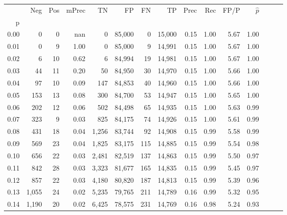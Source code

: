 \begin{tabular}{rrrrrrrrrrrrrrr}
\toprule
{} &    Neg &  Pos & mPrec &      TN &      FP &      FN &      TP &  Prec &   Rec &  FP/P & $\hat{p}$ \\
p    &        &      &       &         &         &         &         &       &       &       &           \\
\midrule
0.00 &      0 &    0 &   nan &       0 &  85,000 &       0 &  15,000 &  0.15 &  1.00 &  5.67 &      1.00 \\
0.01 &      0 &    9 &  1.00 &       0 &  85,000 &       9 &  14,991 &  0.15 &  1.00 &  5.67 &      1.00 \\
0.02 &      6 &   10 &  0.62 &       6 &  84,994 &      19 &  14,981 &  0.15 &  1.00 &  5.67 &      1.00 \\
0.03 &     44 &   11 &  0.20 &      50 &  84,950 &      30 &  14,970 &  0.15 &  1.00 &  5.66 &      1.00 \\
0.04 &     97 &   10 &  0.09 &     147 &  84,853 &      40 &  14,960 &  0.15 &  1.00 &  5.66 &      1.00 \\
0.05 &    153 &   13 &  0.08 &     300 &  84,700 &      53 &  14,947 &  0.15 &  1.00 &  5.65 &      1.00 \\
0.06 &    202 &   12 &  0.06 &     502 &  84,498 &      65 &  14,935 &  0.15 &  1.00 &  5.63 &      0.99 \\
0.07 &    323 &    9 &  0.03 &     825 &  84,175 &      74 &  14,926 &  0.15 &  1.00 &  5.61 &      0.99 \\
0.08 &    431 &   18 &  0.04 &   1,256 &  83,744 &      92 &  14,908 &  0.15 &  0.99 &  5.58 &      0.99 \\
0.09 &    569 &   23 &  0.04 &   1,825 &  83,175 &     115 &  14,885 &  0.15 &  0.99 &  5.54 &      0.98 \\
0.10 &    656 &   22 &  0.03 &   2,481 &  82,519 &     137 &  14,863 &  0.15 &  0.99 &  5.50 &      0.97 \\
0.11 &    842 &   28 &  0.03 &   3,323 &  81,677 &     165 &  14,835 &  0.15 &  0.99 &  5.45 &      0.97 \\
0.12 &    857 &   22 &  0.03 &   4,180 &  80,820 &     187 &  14,813 &  0.15 &  0.99 &  5.39 &      0.96 \\
0.13 &  1,055 &   24 &  0.02 &   5,235 &  79,765 &     211 &  14,789 &  0.16 &  0.99 &  5.32 &      0.95 \\
0.14 &  1,190 &   20 &  0.02 &   6,425 &  78,575 &     231 &  14,769 &  0.16 &  0.98 &  5.24 &      0.93 \\

\end{tabular}
